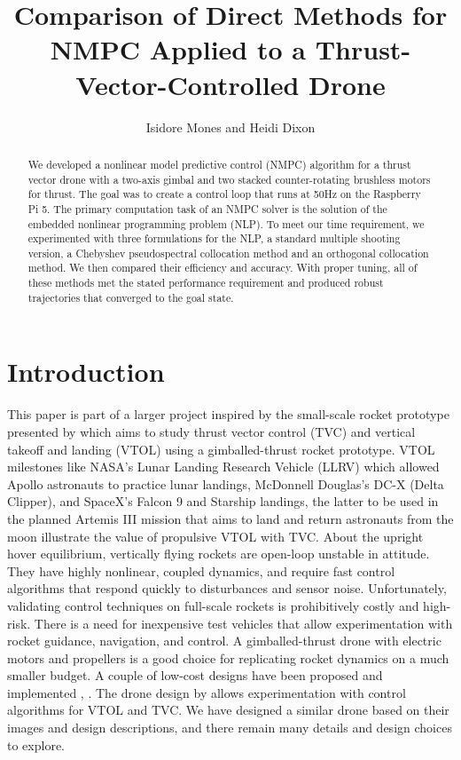 \documentclass[]{article}
\title{Comparison of Direct Methods for NMPC Applied to a Thrust-Vector-Controlled Drone}
\author{Isidore Mones and Heidi Dixon}
\begin{document}
\maketitle
	
\begin{abstract}
	We developed a nonlinear model predictive control (NMPC) algorithm for a thrust vector drone with a two-axis gimbal and two stacked counter-rotating brushless motors for thrust.  The goal was to create a control loop that runs at 50Hz on the Raspberry Pi 5. The primary computation task of an NMPC solver is the solution of the embedded nonlinear programming problem (NLP). To meet our time requirement, we experimented with three formulations for the NLP,  a standard multiple shooting version, a Chebyshev pseudospectral collocation method and an orthogonal collocation method.  We then compared their efficiency and accuracy. With proper tuning, all of these methods met the stated performance requirement  and produced robust trajectories that converged to the goal state. 
\end{abstract}
\section*{Introduction}	
	This paper is part of a larger project inspired by the small-scale rocket prototype presented by \cite{TVCDrone} which aims to study thrust vector control (TVC) and vertical takeoff and landing (VTOL) using a gimballed-thrust rocket prototype. 
	VTOL milestones like NASA's Lunar Landing Research Vehicle (LLRV) which allowed Apollo astronauts to practice lunar landings, McDonnell Douglas’s DC-X (Delta Clipper), and SpaceX's Falcon 9 and Starship landings, the latter to be used in the planned Artemis III mission that aims to land and return astronauts from the moon illustrate the value of propulsive VTOL with TVC. 	
	About the upright hover equilibrium, vertically flying rockets are open-loop unstable in attitude. They have highly nonlinear, coupled dynamics, and require fast control algorithms that respond quickly to disturbances and sensor noise. Unfortunately, validating control techniques on full-scale rockets is prohibitively costly and high-risk. There is a need for inexpensive test vehicles that allow experimentation with rocket guidance, navigation, and control. 
	A gimballed-thrust drone with electric motors and propellers is a good choice for replicating rocket dynamics on a much smaller budget. A couple of low-cost designs have been proposed and implemented  \citep{cheapTVC}, \citep{TVCDrone}. The drone design by \cite{TVCDrone} allows experimentation with control algorithms for VTOL and TVC. We have designed a similar drone based on their images and design descriptions, and there remain many details and design choices to explore.
\end{document}
